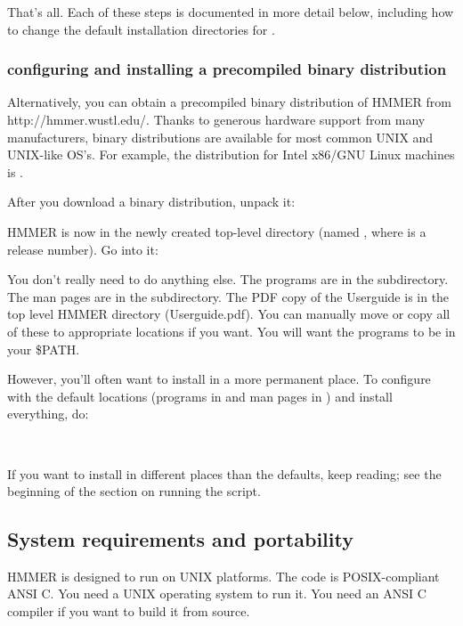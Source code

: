 That's all.  Each of these steps is documented in more detail below,
including how to change the default installation directories for
.

\subsubsection{configuring and installing a precompiled binary distribution}

Alternatively, you can obtain a precompiled binary distribution of
HMMER from 
{http://hmmer.wustl.edu/}. Thanks to generous hardware support from
many manufacturers, binary distributions are available for most common
UNIX and UNIX-like OS's. For example, the distribution for Intel
x86/GNU Linux machines is
.

After you download a binary distribution, unpack it:


HMMER is now in the newly created top-level directory (named
, where  is a release number). Go into
it:


You don't really need to do anything else. The programs are in the
 subdirectory. The man pages are in the
 subdirectory.  The PDF copy of the Userguide
is in the top level HMMER directory (Userguide.pdf).  You can manually
move or copy all of these to appropriate locations if you want. You
will want the programs to be in your \$PATH.

However, you'll often want to install in a more permanent place.  To
configure with the default locations (programs in
 and man pages in )
and install everything, do:

\\

If you want to install in different places than the defaults, keep
reading; see the beginning of the section on running the
 script.

\subsection{System requirements and portability}

HMMER is designed to run on UNIX platforms. The code is
POSIX-compliant ANSI C.  You need a UNIX operating system to run it.
You need an ANSI C compiler if you want to build it from source. 

